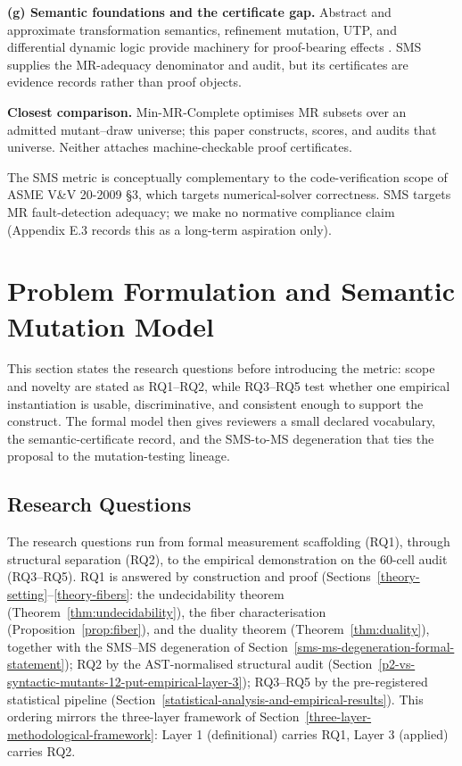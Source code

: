 \documentclass[manuscript,screen,review]{acmart}
\begin{document}
\textbf{(g) Semantic foundations and the certificate gap.} Abstract and
approximate transformation semantics, refinement mutation, UTP, and
differential dynamic logic provide machinery for proof-bearing effects
\citep{46aba24d3e925f6d8d2efd5b5f6ee0d5ea7558cd,72269d5ab33ed790ece6856ba0309ed070d83622,11efca8804ed387c9cc3956868f0eb43597c8d10,6d492b783178b02dae163fbfe837857b982deed2,92d99528fe8e70345901cf56aa4d1037f0c3aa96,97a550b469c6151734d1220e37a7985d896191ee,7a867d014c3e10e45e4220c5dcf605e8df6ef38d}.
SMS supplies the MR-adequacy denominator and audit, but its certificates
are evidence records rather than proof objects.

\textbf{Closest comparison.} Min-MR-Complete
\citep{li2026minmrcomplete} optimises MR subsets over an admitted
mutant--draw universe; this paper constructs, scores, and audits that
universe. Neither attaches machine-checkable proof certificates.

The SMS metric is conceptually complementary to the code-verification
scope of ASME V\&V 20-2009 §3, which targets numerical-solver
correctness. SMS targets MR fault-detection adequacy; we make no
normative compliance claim (Appendix E.3 records this as a long-term
aspiration only).

\section{Problem Formulation and Semantic Mutation Model}\label{research-questions-and-hypotheses}

This section states the research questions before introducing the metric:
scope and novelty are stated as RQ1--RQ2, while RQ3--RQ5 test whether
one empirical instantiation is usable, discriminative, and consistent
enough to support the construct. The formal model then gives reviewers a
small declared vocabulary, the semantic-certificate record, and the
SMS-to-MS degeneration that ties the proposal to the mutation-testing
lineage.

\subsection{Research Questions}\label{research-questions}

The research questions run from formal measurement
scaffolding (RQ1), through structural separation (RQ2), to the
empirical demonstration on the 60-cell audit (RQ3--RQ5). RQ1 is answered
by construction and proof (Sections~\ref{theory-setting}--\ref{theory-fibers}: the undecidability theorem (Theorem~\ref{thm:undecidability}),
the fiber characterisation (Proposition~\ref{prop:fiber}), and the duality theorem (Theorem~\ref{thm:duality}), together
with the SMS--MS degeneration of Section~\ref{sms-ms-degeneration-formal-statement}); RQ2 by the
AST-normalised structural audit (Section~\ref{p2-vs-syntactic-mutants-12-put-empirical-layer-3}); RQ3--RQ5 by the pre-registered
statistical pipeline (Section~\ref{statistical-analysis-and-empirical-results}). This ordering mirrors the three-layer
framework of Section~\ref{three-layer-methodological-framework}: Layer 1 (definitional) carries RQ1, Layer 3 (applied)
carries RQ2.
\end{document}
